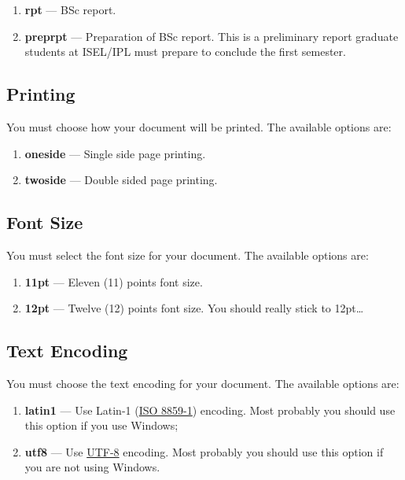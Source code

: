 \begin{enumerate}
    \item \textbf{rpt} --- BSc report.
    \item \textbf{preprpt} --- Preparation of BSc report. This is a preliminary report graduate students at ISEL/IPL must prepare to conclude the first semester.
\end{enumerate}

\subsection{Printing}
\label{sub:printing}

You must choose how your document will be printed. The available options are:
\begin{enumerate}
    \item \textbf{oneside} --- Single side page printing.
    \item \textbf{twoside} --- Double sided page printing.
\end{enumerate}

\subsection{Font Size}
\label{ssec:font_size}

You must select the font size for your document. The available options are:
\begin{enumerate}
    \item \textbf{11pt} --- Eleven (11) points font size.
    \item \textbf{12pt} --- Twelve (12) points font size. You should really stick to 12pt\ldots
\end{enumerate}

\subsection{Text Encoding}
\label{ssec:text_encoding}

You must choose the text encoding for your document. The available options are:
\begin{enumerate}
    \item \textbf{latin1} --- Use Latin-1 (\href{http://en.wikipedia.org/wiki/ISO/IEC_8859-1}{ISO 8859-1}) encoding. Most probably you should use this option if you use Windows;
    \item \textbf{utf8} --- Use \href{http://en.wikipedia.org/wiki/UTF-8}{UTF-8} encoding. Most probably you should use this option if you are not using Windows.
\end{enumerate}

